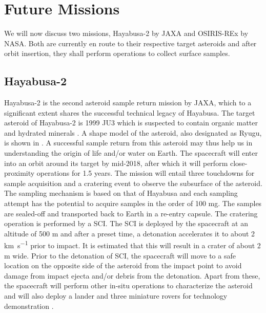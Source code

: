 \section{Future Missions}
\label{sec:future_missions}
We will now discuss two missions, Hayabusa-2 by \gls{JAXA} and \gls{OSIRIS-REx} by \gls{NASA}. Both are currently en route to their respective target asteroids and after orbit insertion, they shall perform operations to collect surface samples.

\subsection{Hayabusa-2}
\label{subsec:hayabusa2_heritage}
Hayabusa-2 is the second asteroid sample return mission by \gls{JAXA}, which to a significant extent shares the successful technical legacy of Hayabusa. The target asteroid of Hayabusa-2 is 1999 JU3 which is suspected to contain organic matter and hydrated minerals \parencite{TsudaHayabusa2SystemDesign}. A shape model of the asteroid, also designated as Ryugu, is shown in  \parencite{ryuguShapeModel}. A successful sample return from this asteroid may thus help us in understanding the origin of life and/or water on Earth. The spacecraft will enter into an orbit around its target by mid-2018, after which it will perform close-proximity operations for 1.5 years. The mission will entail three touchdowns for sample acquisition and a cratering event to observe the subsurface of the asteroid. The sampling mechanism is based on that of Hayabusa and each sampling attempt has the potential to acquire samples in the order of 100 \si{\milli\gram}. The samples are sealed-off and transported back to Earth in a re-entry capsule. The cratering operation is performed by a \gls{SCI}. The \gls{SCI} is deployed by the spacecraft at an altitude of 500 \si{\metre} and after a preset time, a detonation accelerates it to about 2 \si{\kilo\metre\per\second} prior to impact. It is estimated that this will result in a crater of about 2 \si{\metre} wide. Prior to the detonation of \gls{SCI}, the spacecraft will move to a safe location on the opposite side of the asteroid from the impact point to avoid damage from impact ejecta and/or debris from the detonation. Apart from these, the spacecraft will perform other in-situ operations to characterize the asteroid and will also deploy a lander and three miniature rovers for technology demonstration \parencite{TsudaHayabusa2SystemDesign}.
